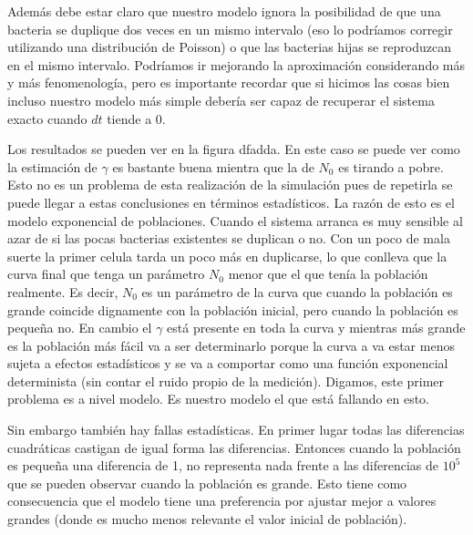 Adem\'as debe estar claro que nuestro modelo ignora la posibilidad de que una bacteria se duplique dos veces en un mismo intervalo (eso lo podr\'iamos corregir utilizando una distribuci\'on de Poisson) o que las bacterias hijas se reproduzcan en el mismo intervalo. Podr\'iamos ir mejorando la aproximaci\'on considerando m\'as y m\'as fenomenolog\'ia, pero es importante recordar que si hicimos las cosas bien incluso nuestro modelo m\'as simple deber\'ia ser capaz de recuperar el sistema exacto cuando $dt$ tiende a 0. 


Los resultados se pueden ver en la figura dfadda. En este caso se puede ver como la estimaci\'on de $\gamma$ es bastante buena mientra que la de $N_0$ es tirando a pobre. Esto no es un problema de esta realización de la simulación pues de repetirla se puede llegar a estas conclusiones en términos estadísticos. La raz\'on de esto es el modelo exponencial de poblaciones. Cuando el sistema arranca es muy sensible al azar de si las pocas bacterias existentes se duplican o no. Con un poco de mala suerte la primer celula tarda un poco más en duplicarse, lo que conlleva que la curva final que tenga un parámetro $N_0$ menor que el que tenía la población realmente. Es decir, $N_0$ es un parámetro de la curva que cuando la población es grande coincide dignamente con la población inicial, pero cuando la población es pequeña no. En cambio el $\gamma$ est\'a presente en toda la curva y mientras m\'as grande es la poblaci\'on m\'as f\'acil va a ser determinarlo porque la curva a va estar menos sujeta a efectos estad\'isticos y se va a comportar como una funci\'on exponencial determinista (sin contar el ruido propio de la medici\'on). Digamos, este primer problema es a nivel modelo. Es nuestro modelo el que est\'a fallando en esto.

Sin embargo tambi\'en hay fallas estad\'isticas. En primer lugar todas las diferencias cuadr\'aticas castigan de igual forma las diferencias. Entonces cuando la poblaci\'on es pequeña una diferencia de 1, no representa nada frente a las diferencias de $10^5$ que se pueden observar cuando la poblaci\'on es grande. Esto tiene como consecuencia que el modelo tiene una preferencia por ajustar mejor a valores grandes (donde es mucho menos relevante el valor inicial de poblaci\'on).




